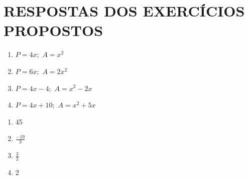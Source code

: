 \section{RESPOSTAS DOS EXERCÍCIOS PROPOSTOS}

\begin{respostas}{1}
    \ansitem{} \begin{multicols}{2}
        \begin{enumerate}[label=\alph*)]
            \item $P = 4x;$ $A = x^2$
        
            \item $P = 6x;$ $A = 2x^2$
        
            \item $P = 4x-4;$ $A = x^2-2x$
            
            \item $P = 4x+10;$ $A = x^2+5x$
        \end{enumerate}
    \end{multicols}
    
    
    
    
    
    \ansitem{} \begin{multicols}{4}
        \begin{enumerate}[label=\alph*)]
            \item 45
        
            \item $\frac{-19}{3}$
        
            \item $\frac{3}{2}$
            
            \item 2
        \end{enumerate}
    \end{multicols}
    
\end{respostas}
